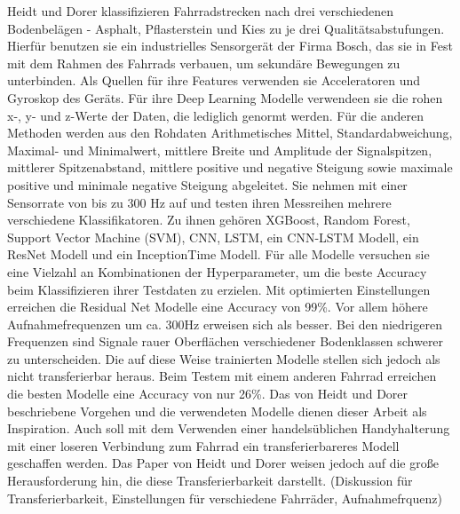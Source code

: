 Heidt und Dorer klassifizieren Fahrradstrecken nach drei verschiedenen Bodenbelägen - Asphalt, Pflasterstein und Kies zu je drei Qualitätsabstufungen. Hierfür benutzen sie ein industrielles Sensorgerät der Firma Bosch, das sie in Fest mit dem Rahmen des Fahrrads verbauen, um sekundäre Bewegungen zu unterbinden. Als Quellen für ihre Features verwenden sie Acceleratoren und Gyroskop des Geräts. Für ihre Deep Learning Modelle verwendeen sie die rohen x-, y- und z-Werte der Daten, die lediglich genormt werden. Für die anderen Methoden werden aus den Rohdaten Arithmetisches Mittel, Standardabweichung, Maximal- und Minimalwert, mittlere Breite und Amplitude der Signalspitzen, mittlerer Spitzenabstand, mittlere positive und negative Steigung sowie maximale positive und minimale negative Steigung abgeleitet. Sie nehmen mit einer Sensorrate von bis zu 300 Hz auf und testen ihren Messreihen mehrere verschiedene Klassifikatoren. Zu ihnen gehören XGBoost, Random Forest, Support Vector Machine (SVM), CNN, LSTM, ein CNN-LSTM Modell, ein ResNet Modell und ein InceptionTime Modell. Für alle Modelle versuchen sie eine Vielzahl an Kombinationen der Hyperparameter, um die beste Accuracy beim Klassifizieren ihrer Testdaten zu erzielen. Mit optimierten Einstellungen erreichen die Residual Net Modelle eine Accuracy von 99\%. Vor allem höhere Aufnahmefrequenzen um ca. 300Hz erweisen sich als besser. Bei den niedrigeren Frequenzen sind Signale rauer Oberflächen verschiedener Bodenklassen schwerer zu unterscheiden. Die auf diese Weise trainierten Modelle stellen sich jedoch als nicht transferierbar heraus. Beim Testem mit einem anderen Fahrrad erreichen die besten Modelle eine Accuracy von nur 26\%. \cite{Heidt2021} Das von Heidt und Dorer beschriebene Vorgehen und die verwendeten Modelle dienen dieser Arbeit als Inspiration. Auch soll mit dem Verwenden einer handelsüblichen Handyhalterung mit einer loseren Verbindung zum Fahrrad ein transferierbareres Modell geschaffen werden. Das Paper von Heidt und Dorer weisen jedoch auf die große Herausforderung hin, die diese Transferierbarkeit darstellt. (Diskussion für Transferierbarkeit, Einstellungen für verschiedene Fahrräder, Aufnahmefrquenz)


